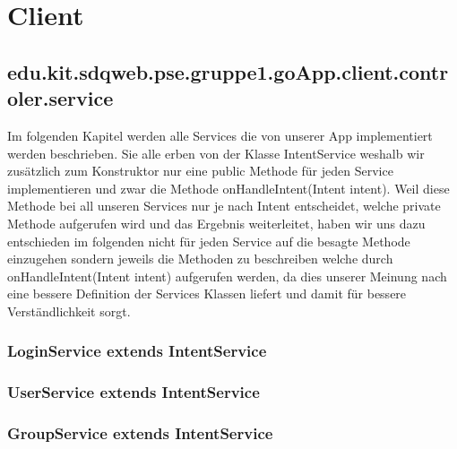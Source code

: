 
\section{Client} 
	\subsection{edu.kit.sdqweb.pse.gruppe1.goApp.client.controler.service}
	Im folgenden Kapitel werden alle Services die von unserer App implementiert werden beschrieben.
	Sie alle erben von der Klasse IntentService weshalb wir zusätzlich zum Konstruktor nur eine public Methode für jeden Service implementieren und zwar die Methode onHandleIntent(Intent intent).
	Weil diese Methode bei all unseren Services nur je nach Intent entscheidet, welche private Methode aufgerufen wird und das Ergebnis weiterleitet, haben wir uns dazu entschieden im folgenden nicht für jeden Service auf die besagte Methode einzugehen sondern jeweils die Methoden zu beschreiben welche durch onHandleIntent(Intent intent) aufgerufen werden, da dies unserer Meinung nach eine bessere Definition der Services Klassen liefert und damit für bessere Verständlichkeit sorgt. 
	
	\subsubsection {LoginService extends IntentService}
	\subsubsection {UserService extends IntentService}
	\subsubsection {GroupService extends IntentService}
